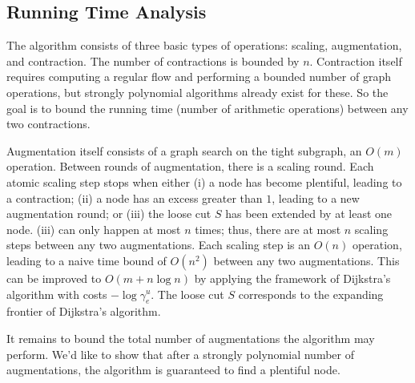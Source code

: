 \documentclass[11pt]{article}
\theoremstyle{definition}
\theoremstyle{definition}
\begin{document}
    \subsection{Running Time Analysis}
    The algorithm consists of three basic types of operations: scaling, augmentation, and contraction.
    The number of contractions is bounded by $n$. Contraction itself
    requires computing a regular flow and performing a bounded number of graph operations, but
    strongly polynomial algorithms already exist for these. So the goal is to bound the running time
    (number of arithmetic operations) between any two contractions.

    Augmentation itself consists of a graph search on the tight subgraph, an $O(m)$ operation.
    Between rounds of augmentation, there is a scaling round. Each atomic scaling step stops
    when either (i) a node has become plentiful, leading to a contraction; (ii) a node has an
    excess greater than $1$, leading to a new augmentation round; or (iii) the loose cut
    $S$ has been extended by at least one node. (iii) can only happen at most $n$ times; thus,
    there are at most $n$ scaling steps between any two augmentations. Each scaling step
    is an $O(n)$ operation, leading to a naive time bound of $O(n^2)$ between any two augmentations.
    This can be improved to $O(m + n \log n)$ by applying the framework of Dijkstra's
    algorithm with costs $-\log \gamma^u_e$. The loose cut $S$ corresponds to the expanding
    frontier of Dijkstra's algorithm.

    It remains to bound the total number of augmentations the algorithm may perform. We'd
    like to show that after a strongly polynomial number of augmentations, the algorithm
    is guaranteed to find a plentiful node.
\end{document}
